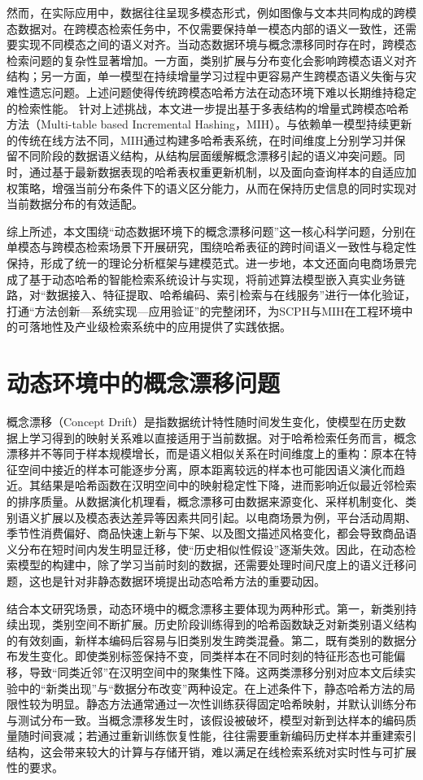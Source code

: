 然而，在实际应用中，数据往往呈现多模态形式，例如图像与文本共同构成的跨模态数据对。在跨模态检索任务中，不仅需要保持单一模态内部的语义一致性，还需要实现不同模态之间的语义对齐。当动态数据环境与概念漂移同时存在时，跨模态检索问题的复杂性显著增加。一方面，类别扩展与分布变化会影响跨模态语义对齐结构；另一方面，单一模型在持续增量学习过程中更容易产生跨模态语义失衡与灾难性遗忘问题。上述问题使得传统跨模态哈希方法在动态环境下难以长期维持稳定的检索性能。
针对上述挑战，本文进一步提出基于多表结构的增量式跨模态哈希方法（Multi-table based Incremental Hashing，MIH）。与依赖单一模型持续更新的传统在线方法不同，MIH通过构建多哈希表系统，在时间维度上分别学习并保留不同阶段的数据语义结构，从结构层面缓解概念漂移引起的语义冲突问题。同时，通过基于最新数据表现的哈希表权重更新机制，以及面向查询样本的自适应加权策略，增强当前分布条件下的语义区分能力，从而在保持历史信息的同时实现对当前数据分布的有效适配。

综上所述，本文围绕“动态数据环境下的概念漂移问题”这一核心科学问题，分别在单模态与跨模态检索场景下开展研究，围绕哈希表征的跨时间语义一致性与稳定性保持，形成了统一的理论分析框架与建模范式。进一步地，本文还面向电商场景完成了基于动态哈希的智能检索系统设计与实现，将前述算法模型嵌入真实业务链路，对“数据接入、特征提取、哈希编码、索引检索与在线服务”进行一体化验证，打通“方法创新—系统实现—应用验证”的完整闭环，为SCPH与MIH在工程环境中的可落地性及产业级检索系统中的应用提供了实践依据。
\section{动态环境中的概念漂移问题}

概念漂移（Concept Drift）是指数据统计特性随时间发生变化，使模型在历史数据上学习得到的映射关系难以直接适用于当前数据。对于哈希检索任务而言，概念漂移并不等同于样本规模增长，而是语义相似关系在时间维度上的重构：原本在特征空间中接近的样本可能逐步分离，原本距离较远的样本也可能因语义演化而趋近。其结果是哈希函数在汉明空间中的映射稳定性下降，进而影响近似最近邻检索的排序质量。从数据演化机理看，概念漂移可由数据来源变化、采样机制变化、类别语义扩展以及模态表达差异等因素共同引起。以电商场景为例，平台活动周期、季节性消费偏好、商品快速上新与下架、以及图文描述风格变化，都会导致商品语义分布在短时间内发生明显迁移，使“历史相似性假设”逐渐失效。因此，在动态检索模型的构建中，除了学习当前时刻的数据，还需要处理时间尺度上的语义迁移问题，这也是针对非静态数据环境提出动态哈希方法的重要动因。

结合本文研究场景，动态环境中的概念漂移主要体现为两种形式。第一，新类别持续出现，类别空间不断扩展。历史阶段训练得到的哈希函数缺乏对新类别语义结构的有效刻画，新样本编码后容易与旧类别发生跨类混叠。第二，既有类别的数据分布发生变化。即使类别标签保持不变，同类样本在不同时刻的特征形态也可能偏移，导致“同类近邻”在汉明空间中的聚集性下降。这两类漂移分别对应本文后续实验中的“新类出现”与“数据分布改变”两种设定。在上述条件下，静态哈希方法的局限性较为明显。静态方法通常通过一次性训练获得固定哈希映射，并默认训练分布与测试分布一致。当概念漂移发生时，该假设被破坏，模型对新到达样本的编码质量随时间衰减；若通过重新训练恢复性能，往往需要重新编码历史样本并重建索引结构，这会带来较大的计算与存储开销，难以满足在线检索系统对实时性与可扩展性的要求。

